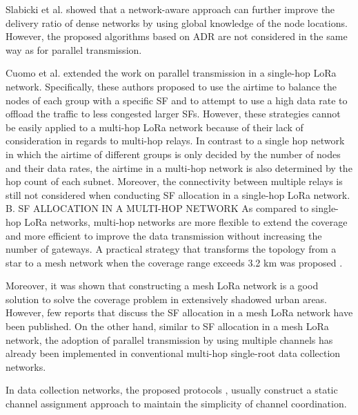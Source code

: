 Slabicki et al.
\cite{slabicki_adaptive_2018} showed that a network-aware approach can further improve the delivery ratio of dense networks by using global knowledge of the node locations.
However,
	the proposed algorithms based on ADR are not considered in the same way as for parallel transmission.

Cuomo et al.
\cite{cuomo_explora_2017} extended the work on parallel transmission in a single-hop LoRa network.
Specifically,
	these authors proposed to use the airtime to balance the nodes of each group with a specific SF and to attempt to use a high data rate to offload the traffic to less congested larger SFs.
However,
	these strategies cannot be easily applied to a multi-hop LoRa network because of their lack of consideration in regards to multi-hop relays.
In contrast to a single hop network in which the airtime of different groups is only decided by the number of nodes and their data rates,
	the airtime in a multi-hop network is also determined by the hop count of each subnet.
Moreover,
	the connectivity between multiple relays is still not considered when conducting SF allocation in a single-hop LoRa network.
B.
SF ALLOCATION IN A MULTI-HOP NETWORK As compared to single-hop LoRa networks,
	multi-hop networks are more flexible to extend the coverage and more efficient to improve the data transmission without increasing the number of gateways.
A practical strategy that transforms the topology from a star to a mesh network when the coverage range exceeds 3.2 km was proposed \cite{ochoa_evaluating_2017}.

Moreover,
	it was shown \cite{ke_lora_2017} that constructing a mesh LoRa network is a good solution to solve the coverage problem in extensively shadowed urban areas.
However,
	few reports that discuss the SF allocation in a mesh LoRa network have been published.
On the other hand,
	similar to SF allocation in a mesh LoRa network,
	the adoption of parallel transmission by using multiple channels has already been implemented in conventional multi-hop single-root data collection networks.

In data collection networks,
	the proposed protocols \cite{wu_realistic_2008},
	\cite{liew_fast_2018} usually construct a static channel assignment approach to maintain the simplicity of channel coordination.

